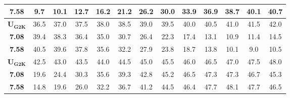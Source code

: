 \documentclass{ctexart}
\begin{document}
\begin{table}[h]
\begin{tabular}{ c | c c c c c c c c c c c c}
      \textbf{7.58} & 9.7  & 10.1  & 12.7  & 16.2  & 21.2  & 26.2  & 30.0  & 33.9  & 36.9  & 38.7  & 40.1  & 40.7 \\
      \hline
      $\mathbf{U_{G2K}}$  & 36.5  & 37.0  & 37.5  & 38.0  & 38.5  & 39.0  & 39.5  & 40.0  & 40.5  & 41.0  & 41.5  & 42.0\\
      \hline
      \textbf{7.08} & 39.4  & 38.3  & 36.4  & 35.0  & 30.7  & 26.4  & 22.3  & 17.4  & 13.1  & 10.9  & 11.4  & 14.5 \\
      \textbf{7.58} & 40.5  & 39.6  & 37.8  & 35.6  & 32.2  & 27.9  & 23.8  & 18.7  & 13.8  & 10.1  & 9.0  & 10.5 \\
      \hline
      $\mathbf{U_{G2K}}$  & 42.5  & 43.0  & 43.5  & 44.0  & 44.5  & 45.0  & 45.5  & 46.0  & 46.5  & 47.0  & 47.5  & 48.0\\
      \hline
      \textbf{7.08} & 19.6  & 24.4  & 30.3  & 35.6  & 39.3  & 42.8  & 45.2  & 46.5  & 47.3  & 47.3  & 46.7  & 45.3 \\
      \textbf{7.58} & 14.8  & 19.6  & 26.0  & 32.2  & 36.7  & 41.2  & 44.5  & 46.4  & 47.7  & 48.1  & 47.7  & 46.5 \\
      \bottomrule
    \end{tabular}
\end{table}
\end{document}
